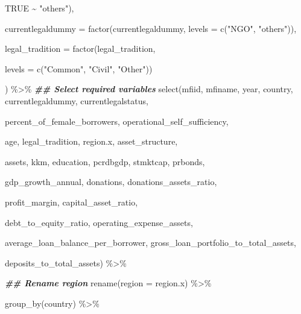 \documentclass[a4paper,nobind]{templates/ociamthesis}
\newenvironment{Shaded}{\begin{snugshade}}{\end{snugshade}}
\newcommand{\AttributeTok}[1]{\textcolor[rgb]{0.77,0.63,0.00}{#1}}
\newcommand{\ConstantTok}[1]{\textcolor[rgb]{0.00,0.00,0.00}{#1}}
\newcommand{\DocumentationTok}[1]{\textcolor[rgb]{0.56,0.35,0.01}{\textbf{\textit{#1}}}}
\newcommand{\FunctionTok}[1]{\textcolor[rgb]{0.00,0.00,0.00}{#1}}
\newcommand{\NormalTok}[1]{#1}
\newcommand{\SpecialCharTok}[1]{\textcolor[rgb]{0.00,0.00,0.00}{#1}}
\newcommand{\StringTok}[1]{\textcolor[rgb]{0.31,0.60,0.02}{#1}}
\renewenvironment{Shaded}
{
  \vspace{10pt}%
  \begin{snugshade}%
}{%
  \end{snugshade}%
  \vspace{8pt}%
}
\begin{document}
\begin{Shaded}
\begin{Highlighting}[]
                                           \ConstantTok{TRUE} \SpecialCharTok{\textasciitilde{}} \StringTok{"others"}\NormalTok{),}
      
        \AttributeTok{currentlegaldummy =} \FunctionTok{factor}\NormalTok{(currentlegaldummy, }\AttributeTok{levels =} \FunctionTok{c}\NormalTok{(}\StringTok{"NGO"}\NormalTok{, }\StringTok{"others"}\NormalTok{)),}
        
        \AttributeTok{legal\_tradition =} \FunctionTok{factor}\NormalTok{(legal\_tradition, }
                                 
                                 \AttributeTok{levels =} \FunctionTok{c}\NormalTok{(}\StringTok{"Common"}\NormalTok{, }\StringTok{"Civil"}\NormalTok{, }\StringTok{"Other"}\NormalTok{))}
        
\NormalTok{        ) }\SpecialCharTok{\%\textgreater{}\%} 
  \DocumentationTok{\#\# Select required variables }
  \FunctionTok{select}\NormalTok{(mfiid, mfiname, year, country, currentlegaldummy, currentlegalstatus, }
         
\NormalTok{         percent\_of\_female\_borrowers, operational\_self\_sufficiency,}
         
\NormalTok{         age, legal\_tradition, region.x, asset\_structure, }
         
\NormalTok{         assets, kkm, education, pcrdbgdp, stmktcap, prbonds, }
         
\NormalTok{         gdp\_growth\_annual, donations, donations\_assets\_ratio, }
         
\NormalTok{         profit\_margin, capital\_asset\_ratio,}
         
\NormalTok{         debt\_to\_equity\_ratio, operating\_expense\_assets, }
         
\NormalTok{         average\_loan\_balance\_per\_borrower, gross\_loan\_portfolio\_to\_total\_assets, }
         
\NormalTok{         deposits\_to\_total\_assets) }\SpecialCharTok{\%\textgreater{}\%} 
  
          \DocumentationTok{\#\# Rename region}
         \FunctionTok{rename}\NormalTok{(}\AttributeTok{region =}\NormalTok{ region.x) }\SpecialCharTok{\%\textgreater{}\%} 
  
  \FunctionTok{group\_by}\NormalTok{(country) }\SpecialCharTok{\%\textgreater{}\%} 
  

\end{Highlighting}
\end{Shaded}
\end{document}
